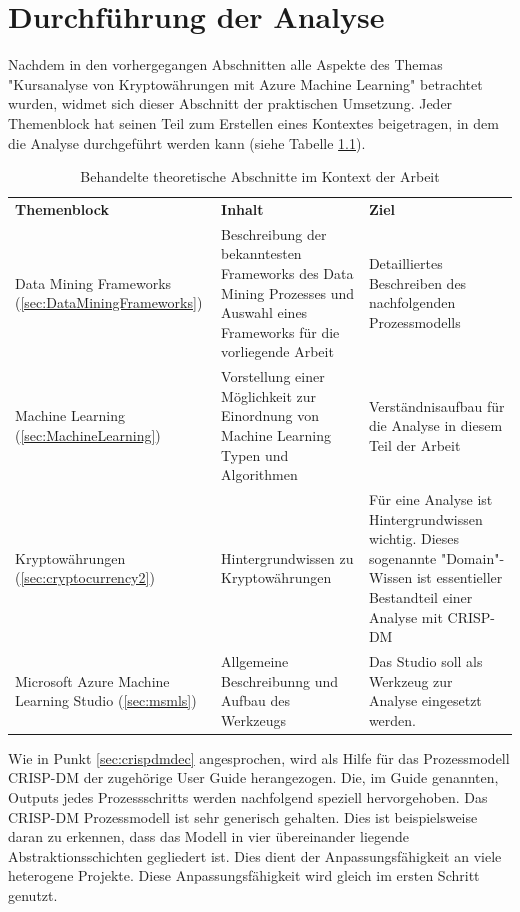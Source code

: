 \chapter{Durchführung der Analyse}
Nachdem in den vorhergegangen Abschnitten alle Aspekte des Themas "Kursanalyse von Kryptowährungen mit Azure Machine Learning" betrachtet wurden, widmet sich dieser Abschnitt der praktischen Umsetzung. Jeder Themenblock hat seinen Teil zum Erstellen eines Kontextes beigetragen, in dem die Analyse durchgeführt werden kann (siehe Tabelle \ref{tab:themeblocks}).
\begin{table}[H]
\begin{tabular}{|p{}|p{6cm}|p{7cm}|}
\hline
\textbf{Themenblock} & \textbf{Inhalt} & \textbf{Ziel}\\ 
\hhline{===}
Data Mining Frameworks (\ref{sec:DataMiningFrameworks}) & Beschreibung der bekanntesten Frameworks des Data Mining Prozesses und Auswahl eines Frameworks für die vorliegende Arbeit & Detailliertes Beschreiben des nachfolgenden Prozessmodells\\
\hline
Machine Learning (\ref{sec:MachineLearning}) & Vorstellung einer Möglichkeit zur Einordnung von Machine Learning Typen und Algorithmen & Verständnisaufbau für die Analyse in diesem Teil der Arbeit\\
\hline
Kryptowährungen (\ref{sec:cryptocurrency2}) & Hintergrundwissen zu Kryptowährungen & Für eine Analyse ist Hintergrundwissen wichtig. Dieses sogenannte "Domain"-Wissen ist essentieller Bestandteil einer Analyse mit CRISP-DM\\
\hline
Microsoft Azure Machine Learning Studio (\ref{sec:msmls}) & Allgemeine Beschreibunng und Aufbau des Werkzeugs & Das Studio soll als Werkzeug zur Analyse eingesetzt werden.\\
\hline
\end{tabular}
\caption{Behandelte theoretische Abschnitte im Kontext der Arbeit}
\label{tab:themeblocks}
\end{table}
Wie in Punkt \ref{sec:crispdmdec} angesprochen, wird als Hilfe für das Prozessmodell CRISP-DM der zugehörige User Guide \citep[S.~30-56]{chapman_crisp-dm_2000} herangezogen. Die, im Guide genannten, Outputs jedes Prozessschritts werden nachfolgend speziell hervorgehoben. Das CRISP-DM Prozessmodell ist sehr generisch gehalten. Dies ist beispielsweise daran zu erkennen, dass das Modell in vier übereinander liegende Abstraktionsschichten gegliedert ist.\citep[S.~6]{chapman_crisp-dm_2000} Dies dient der Anpassungsfähigkeit an viele heterogene Projekte. Diese Anpassungsfähigkeit wird gleich im ersten Schritt genutzt.\newline
 
